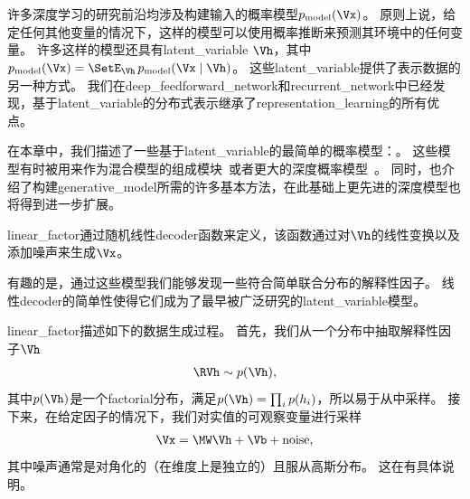 \chapter{}
\label{chap:linear_factor_models}




许多深度学习的研究前沿均涉及构建输入的概率模型$p_{\text{model}}(\Vx)$。
原则上说，给定任何其他变量的情况下，这样的模型可以使用概率推断来预测其环境中的任何变量。
许多这样的模型还具有\gls{latent_variable} $\Vh$，其中$p_{\text{model}}(\Vx) = \SetE_{\Vh}\, p_{\text{model}}(\Vx\mid\Vh)$。
这些\gls{latent_variable}提供了表示数据的另一种方式。
我们在\gls{deep_feedforward_network}和\gls{recurrent_network}中已经发现，基于\gls{latent_variable}的分布式表示继承了\gls{representation_learning}的所有优点。


在本章中，我们描述了一些基于\gls{latent_variable}的最简单的概率模型：。
这些模型有时被用来作为混合模型的组成模块~\citep{Hinton-nips95,ghahramani96em,Roweis+Saul+Hinton-2002}或者更大的深度概率模型~\citep{tang2012deep}。
同时，也介绍了构建\gls{generative_model}所需的许多基本方法，在此基础上更先进的深度模型也将得到进一步扩展。


\gls{linear_factor}通过随机线性\gls{decoder}函数来定义，该函数通过对$\Vh$的线性变换以及添加噪声来生成$\Vx$。


有趣的是，通过这些模型我们能够发现一些符合简单联合分布的解释性因子。
线性\gls{decoder}的简单性使得它们成为了最早被广泛研究的\gls{latent_variable}模型。


\gls{linear_factor}描述如下的数据生成过程。 
首先，我们从一个分布中抽取解释性因子$\Vh$
\begin{align}
\label{eqn:131}
\RVh \sim p(\Vh),
\end{align}
其中$p(\Vh)$是一个\gls{factorial}分布，满足$p(\Vh) = \prod_{i}^{}p(h_i)$，所以易于从中采样。
接下来，在给定因子的情况下，我们对实值的可观察变量进行采样
\begin{align}
\label{eqn:132}
\Vx = \MW \Vh + \Vb + \text{noise},
\end{align}
其中噪声通常是对角化的（在维度上是独立的）且服从高斯分布。
这在有具体说明。


